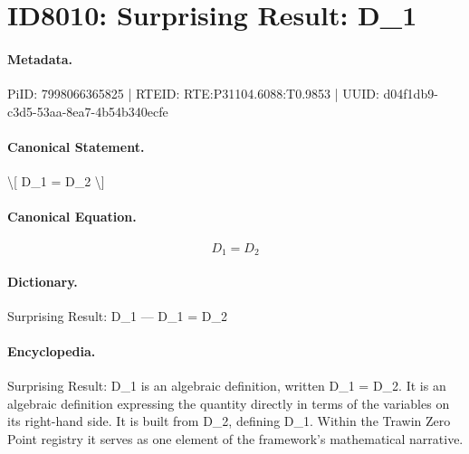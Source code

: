 \section*{ID8010: Surprising Result: D\_1}
\paragraph{Metadata.}
PiID: 7998066365825 | RTEID: RTE:P31104.6088:T0.9853 | UUID: d04f1db9-c3d5-53aa-8ea7-4b54b340ecfe

\paragraph{Canonical Statement.}
\textbackslash{}[ D\_1 = D\_2 \textbackslash{}]

\paragraph{Canonical Equation.}
\[
D_1 = D_2
\]

\paragraph{Dictionary.}
Surprising Result: D\_1 — D\_1 = D\_2

\paragraph{Encyclopedia.}
Surprising Result: D\_1 is an algebraic definition, written D\_1 = D\_2. It is an algebraic definition expressing the quantity directly in terms of the variables on its right-hand side. It is built from D\_2, defining D\_1. Within the Trawin Zero Point registry it serves as one element of the framework's mathematical narrative.
